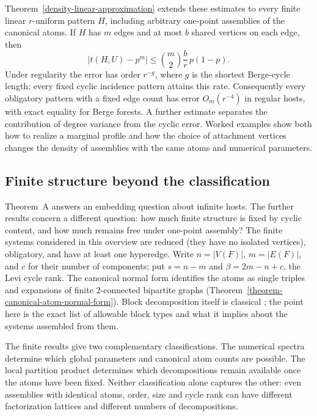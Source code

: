 \documentclass[a4paper,11pt,reqno]{amsart}
\theoremstyle{plain}
\theoremstyle{definition}
\theoremstyle{remark}
\begin{document}
Theorem~\ref{density-linear-approximation} extends these estimates
to every finite linear $r$-uniform pattern $H$, including arbitrary
one-point assemblies of the canonical atoms.  If $H$ has $m$ edges
and at most $b$ shared vertices on each edge, then
\[
 |t(H,U)-p^m|\le\binom m2\frac br\,p(1-p).
\]
Under regularity the error has order $r^{-g}$, where $g$ is the
shortest Berge-cycle length; every fixed cyclic incidence pattern
attains this rate.  Consequently every obligatory pattern with a
fixed edge count has error $O_m(r^{-4})$ in regular hosts, with exact
equality for Berge forests.  A further estimate separates the
contribution of degree variance from the cyclic error.  Worked
examples show both how to realize a marginal profile and how the
choice of attachment vertices changes the density of assemblies
with the same atoms and numerical parameters.

\subsection*{Finite structure beyond the classification}
Theorem~A answers an embedding question about infinite hosts.  The further
results concern a different question: how much finite structure is fixed by
cyclic content, and how much remains free under one-point assembly?  The finite
systems considered in this overview are reduced (they have no isolated
vertices), obligatory, and have at least one hyperedge.  Write \(n=|V(F)|\),
\(m=|E(F)|\), and \(c\) for their number of components; put \(s=n-m\) and
\(\beta=2m-n+c\), the Levi cycle rank.  The
canonical normal form identifies the atoms as single triples and expansions
of finite \(2\)-connected bipartite graphs
(Theorem~\ref{theorem-canonical-atom-normal-form}).  Block decomposition itself
is classical \citep{whitney1932,diestel2017}; the point here is the exact list
of allowable block types and what it implies about the systems assembled
from them.

The finite results give two complementary classifications.  The numerical
spectra determine which global parameters and canonical atom counts are
possible.  The local partition product determines which decompositions
remain available once the atoms have been fixed.  Neither classification
alone captures the other: even assemblies with identical atoms, order,
size and cycle rank can have different factorization lattices and different
numbers of decompositions.
\end{document}
